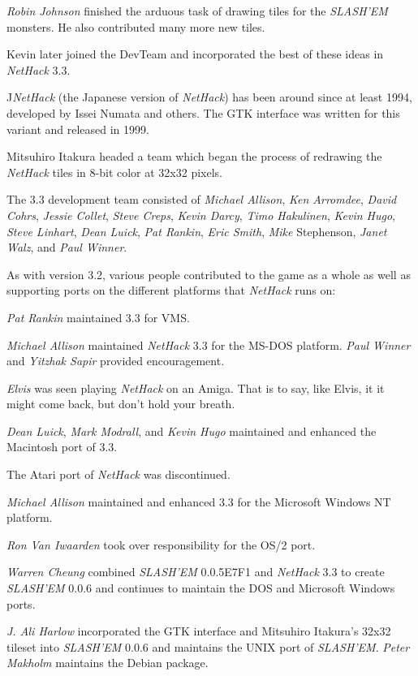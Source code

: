 {\it Robin Johnson\/} finished the arduous task of drawing tiles for the
{\it SLASH'EM\/} monsters.  He also contributed many more new tiles.

Kevin later joined the
DevTeam and incorporated the best of these ideas in {\it NetHack\/} 3.3.

J{\it NetHack\/} (the Japanese version of {\it NetHack\/}) has been around since at least
1994, developed by Issei Numata and others. The GTK interface was written
for this variant and released in 1999.

Mitsuhiro Itakura headed a team which began the process of redrawing the
{\it NetHack\/} tiles in 8-bit color at 32x32 pixels.

The 3.3 development team consisted of {\it Michael Allison}, {\it Ken Arromdee},
{\it David Cohrs}, {\it Jessie Collet}, {\it Steve Creps}, {\it Kevin Darcy}, {\it Timo Hakulinen},
{\it Kevin Hugo}, {\it Steve Linhart}, {\it Dean Luick}, {\it Pat Rankin}, {\it Eric Smith}, {\it Mike}
Stephenson, {\it Janet Walz}, and {\it Paul Winner}.

As with version 3.2, various people contributed to the game as a whole as
well as supporting ports on the different platforms that {\it NetHack\/} runs on:

{\it Pat Rankin\/} maintained 3.3 for VMS.

{\it Michael Allison\/} maintained {\it NetHack\/} 3.3 for the MS-DOS platform.  {\it Paul Winner\/}
and {\it Yitzhak Sapir\/} provided encouragement.

{\it Elvis\/} was seen playing {\it NetHack\/} on an Amiga.  That is to say, like Elvis, it
it might come back, but don't hold your breath.

{\it Dean Luick}, {\it Mark Modrall}, and {\it Kevin Hugo\/} maintained and enhanced the
Macintosh port of 3.3.

The Atari port of {\it NetHack\/} was discontinued.

{\it Michael Allison\/} maintained and enhanced 3.3 for the Microsoft Windows NT platform.

{\it Ron Van Iwaarden\/} took over responsibility for the OS/2 port.

{\it Warren Cheung\/} combined {\it SLASH'EM\/} 0.0.5E7F1 and {\it NetHack\/} 3.3 to create
{\it SLASH'EM\/} 0.0.6 and continues to maintain the DOS and Microsoft Windows ports.

{\it J. Ali Harlow\/} incorporated the GTK interface and Mitsuhiro Itakura's
32x32 tileset into {\it SLASH'EM\/} 0.0.6 and maintains the UNIX port of {\it SLASH'EM}.
{\it Peter Makholm\/} maintains the Debian package.

